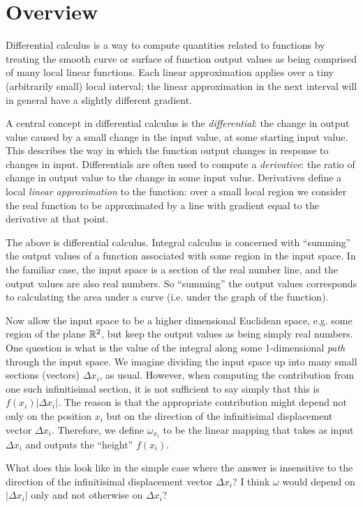 \section{Overview}
Differential calculus is a way to compute quantities related to functions by
treating the smooth curve or surface of function output values as being
comprised of many local linear functions. Each linear approximation applies
over a tiny (arbitrarily small) local interval; the linear approximation in the
next interval will in general have a slightly different gradient.

A central concept in differential calculus is the \textit{differential}: the
change in output value caused by a small change in the input value, at some
starting input value. This describes the way in which the function output
changes in response to changes in input. Differentials are often used to
compute a \textit{derivative}: the ratio of change in output value to the
change in some input value. Derivatives define a local \textit{linear
  approximation} to the function: over a small local region we consider the
real function to be approximated by a line with gradient equal to the
derivative at that point.

The above is differential calculus. Integral calculus is concerned with
``summing'' the output values of a function associated with some region in the
input space. In the familiar case, the input space is a section of the real
number line, and the output values are also real numbers. So ``summing'' the
output values corresponds to calculating the area under a curve (i.e. under the
graph of the function).

Now allow the input space to be a higher dimensional Euclidean space, e.g. some
region of the plane $\mathbb{R}^2$, but keep the output values as being simply real
numbers. One question is what is the value of the integral along some
1-dimensional \textit{path} through the input space. We imagine dividing the
input space up into many small sections (vectors) $\Delta x_i$, as
usual. However, when computing the contribution from one such infinitisimal
section, it is not sufficient to say simply that this is $f(x_i)|\Delta
x_i|$. The reason is that the appropriate contribution might depend not only on
the position $x_i$ but on the direction of the infinitisimal displacement
vector $\Delta x_i$. Therefore, we define $\omega_{x_i}$ to be the linear
mapping that takes as input $\Delta x_i$ and outputs the ``height'' $f(x_i)$.

What does this look like in the simple case where the answer is insensitive to
the direction of the infinitisimal displacement vector $\Delta x_i$? I think
$\omega$ would depend on $|\Delta x_i|$ only and not otherwise on $\Delta x_i$?

